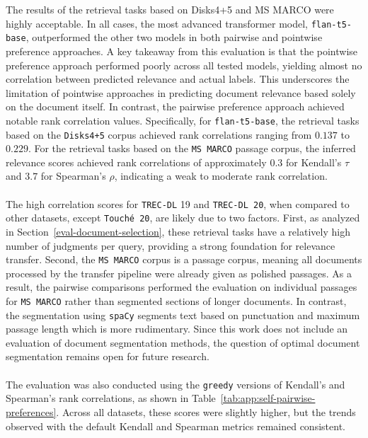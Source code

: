 The results of the retrieval tasks based on Disks4+5 and MS MARCO were highly acceptable. In all cases, the most advanced transformer model, \linebreak \texttt{flan-t5-base}, outperformed the other two models in both pairwise and pointwise preference approaches. A key takeaway from this evaluation is that the pointwise preference approach performed poorly across all tested models, yielding almost no correlation between predicted relevance and actual labels. This underscores the limitation of pointwise approaches in predicting document relevance based solely on the document itself. In contrast, the pairwise preference approach achieved notable rank correlation values. Specifically, for \texttt{flan-t5-base}, the retrieval tasks based on the \texttt{Disks4+5} corpus achieved rank correlations ranging from $0.137$ to $0.229$. For the retrieval tasks based on the \texttt{MS MARCO} passage corpus, the inferred relevance scores achieved rank correlations of approximately $0.3$ for Kendall's $\tau$ and $3.7$ for Spearman's $\rho$, indicating a weak to moderate rank correlation.
\\\\
The high correlation scores for \texttt{TREC-DL} 19 and \texttt{TREC-DL 20}, when compared to other datasets, except \texttt{Touché 20}, are likely due to two factors. First, as analyzed in Section~\ref{eval-document-selection}, these retrieval tasks have a relatively high number of judgments per query, providing a strong foundation for relevance transfer. Second, the \texttt{MS MARCO} corpus is a passage corpus, meaning all documents processed by the transfer pipeline were already given as polished passages. As a result, the pairwise comparisons performed the evaluation on individual passages for \texttt{MS MARCO} rather than segmented sections of longer documents. In contrast, the segmentation using \texttt{spaCy}  segments text based on punctuation and maximum passage length which is more rudimentary. Since this work does not include an evaluation of document segmentation methods, the question of optimal document segmentation remains open for future research.
\\\\
The evaluation was also conducted using the \texttt{greedy} versions of Kendall's and Spearman's rank correlations, as shown in Table~\ref{tab:app:self-pairwise-preferences}. Across all datasets, these scores were slightly higher, but the trends observed with the default Kendall and Spearman metrics remained consistent.
\pagebreak
